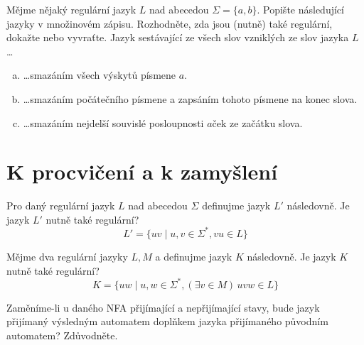\documentclass[a4paper,12pt]{amsart}
\begin{document}
\begin{problem}[Mazání]

    Mějme nějaký regulární jazyk $L$ nad abecedou $\Sigma=\{a,b\}$. Popište následující jazyky v množinovém zápisu. Rozhodněte, zda jsou (nutně) také regulární, dokažte nebo vyvraťte. Jazyk sestávající ze všech slov vzniklých ze slov jazyka $L$\dots
    
    \medskip
    \begin{enumerate}[(a)]\setlength\itemsep{12pt}
            \item \dots smazáním všech výskytů písmene $a$.
            \item \dots smazáním počátečního písmene a zapsáním tohoto písmene na konec slova.
            \item \dots smazáním nejdelší souvislé posloupnosti $a$ček ze začátku slova.
    \end{enumerate}

\end{problem}


\section*{K procvičení a k zamyšlení}


\medskip\begin{problem}[Posun]
    Pro daný regulární jazyk $L$ nad abecedou $\Sigma$ definujme jazyk $L'$ následovně. Je jazyk $L'$ nutně také regulární?
    $$
    L'=\{uv\mid u,v\in\Sigma^*,vu\in L\}
    $$
\end{problem}


\medskip\begin{problem}[Řez]
    Mějme dva regulární jazyky $L,M$ a definujme jazyk $K$ následovně. Je jazyk $K$ nutně také regulární?
    $$
    K=\{uw\mid u,w\in\Sigma^*, (\exists v\in M)\, uvw\in L\}
    $$    
\end{problem}
    
\medskip\begin{problem}        
    Zaměníme-li u daného NFA přijímající a nepřijímající stavy, bude jazyk přijímaný výsledným automatem doplňkem jazyka přijímaného původním automatem? Zdůvodněte.        
\end{problem}
   
\end{document}
